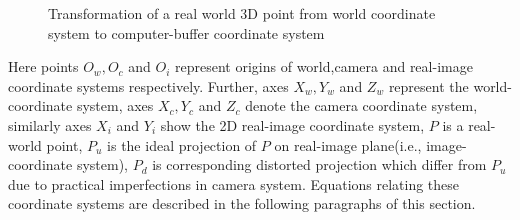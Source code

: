 
\begin{figure}[ht]
\centering
{}
\caption{Transformation of a real world 3D point from world coordinate system to computer-buffer coordinate system}  
\label{fig:coordinate_systems}
\end{figure}  


Here points $O_w,O_c$ and $O_i$ represent origins of world,camera and real-image coordinate systems respectively. Further, axes $X_w,Y_w$ and $Z_w$ represent the world-coordinate system, axes $X_c,Y_c$ and $Z_c$ denote the camera coordinate system, similarly axes $X_i$ and $Y_i$ show the 2D real-image coordinate system, $P$ is a real-world point, $P_u$ is the ideal projection of $P$ on real-image plane(i.e., image-coordinate system), $P_d$ is corresponding distorted projection which differ from $P_u$ due to practical imperfections in camera system. Equations relating these coordinate systems are described in the following paragraphs of this section.  
  
